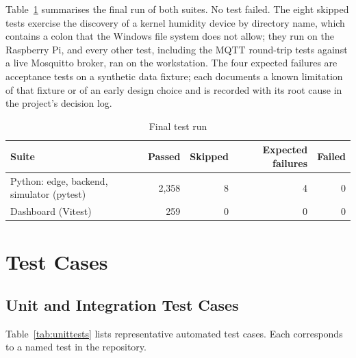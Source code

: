 Table~\ref{tab:testrun} summarises the final run of both suites. No test failed. The eight skipped tests exercise the discovery of a kernel humidity device by directory name, which contains a colon that the Windows file system does not allow; they run on the Raspberry Pi, and every other test, including the MQTT round-trip tests against a live Mosquitto broker, ran on the workstation. The four expected failures are acceptance tests on a synthetic data fixture; each documents a known limitation of that fixture or of an early design choice and is recorded with its root cause in the project's decision log.

\begin{table}[htbp]
\centering
\caption{Final test run}
\label{tab:testrun}
\small
\begin{tabularx}{\textwidth}{@{}X r r r r@{}}
\toprule
\textbf{Suite} & \textbf{Passed} & \textbf{Skipped} & \textbf{Expected failures} & \textbf{Failed} \\
\midrule
Python: edge, backend, simulator (pytest) & 2,358 & 8 & 4 & 0 \\
Dashboard (Vitest) & 259 & 0 & 0 & 0 \\
\bottomrule
\end{tabularx}
\end{table}

\section{Test Cases}

\subsection{Unit and Integration Test Cases}

Table~\ref{tab:unittests} lists representative automated test cases. Each corresponds to a named test in the repository.

